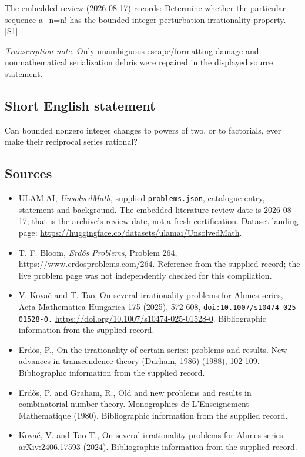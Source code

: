 \documentclass[11pt,a4paper]{article}
\newcommand{\sref}[2]{\hyperlink{source:#1:#2}{[S#2]}}
\begin{document}
The embedded review (2026-08-17) records: Determine whether the particular sequence a\_n=n! has the bounded-integer-perturbation irrationality property. \sref{statement}{1}

{\small\emph{Transcription note.} Only unambiguous escape/formatting damage and nonmathematical serialization debris were repaired in the displayed source statement.}

\subsection{Short English statement}

Can bounded nonzero integer changes to powers of two, or to factorials, ever make their reciprocal series rational?

\subsection{Sources}

{\small

\begin{itemize}

\item[\hypertarget{source:statement:1}{S1}] ULAM.AI, \emph{UnsolvedMath}, supplied \texttt{problems.json}, catalogue entry, statement and background. The embedded literature-review date is 2026-08-17; that is the archive’s review date, not a fresh certification. Dataset landing page: \url{https://huggingface.co/datasets/ulamai/UnsolvedMath}.

\item[\hypertarget{source:statement:2}{S2}] T. F. Bloom, \emph{Erdős Problems}, Problem 264, \url{https://www.erdosproblems.com/264}. Reference from the supplied record; the live problem page was not independently checked for this compilation.

\item[\hypertarget{source:statement:3}{S3}] V. Kovač and T. Tao, On several irrationality problems for Ahmes series, Acta Mathematica Hungarica 175 (2025), 572-608, \nolinkurl{doi:10.1007/s10474-025-01528-0.} \url{https://doi.org/10.1007/s10474-025-01528-0}. Bibliographic information from the supplied record.

\item[\hypertarget{source:statement:4}{S4}] Erd\"{o}s, P., On the irrationality of certain series: problems and results. New advances in transcendence theory (Durham, 1986) (1988), 102-109. Bibliographic information from the supplied record.

\item[\hypertarget{source:statement:5}{S5}] Erd\H{o}s, P. and Graham, R., Old and new problems and results in combinatorial number theory. Monographies de L'Enseignement Mathematique (1980). Bibliographic information from the supplied record.

\item[\hypertarget{source:statement:6}{S6}] Kovač, V. and Tao T., On several irrationality problems for Ahmes series. arXiv:2406.17593 (2024). Bibliographic information from the supplied record.

\end{itemize}

}

\label{end:statement}
\end{document}

